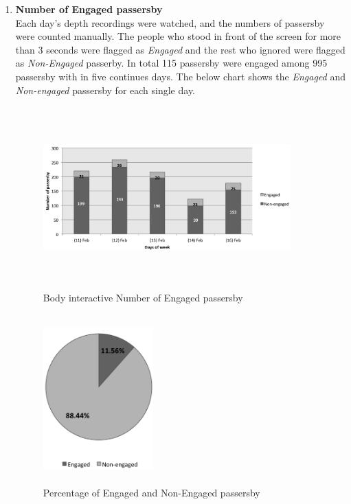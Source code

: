 \begin{enumerate}
\item \textbf{Number of Engaged passersby} \\
Each day’s depth recordings were watched, and the numbers of passersby were counted manually. The people who stood in front of the screen for more than 3 seconds were flagged as \emph{Engaged} and the rest who ignored were flagged as \emph{Non-Engaged} passerby. In total 115 passersby were engaged among 995 passersby with in five continues days. The below chart shows the \emph{Engaged} and \emph{Non-engaged} passersby for each single day.

\begin{figure}[H]
    \centering
    \includegraphics[width=0.9\textwidth,height=7cm]{Figures/8/body_inter_findings/body_inter_engage_day}
    \caption{Body interactive Number of Engaged passersby}%
    \label{fig:bodyengagedandengagedby}%
\end{figure}


\begin{figure}[H]
    \centering
    \includegraphics[width=0.4\textwidth,height=6.5cm]{Figures/8/body_inter_findings/body_eng_percentage}
    \caption{Percentage of Engaged and Non-Engaged passersby}%
    \label{fig:bodyengagedpasserbypercentage}%
\end{figure}


\end{enumerate}

